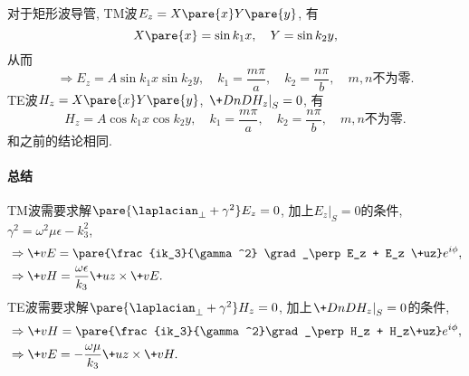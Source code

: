 \documentclass[hidelinks]{ctexart}
\begin{document}
\begin{sample}
    \begin{ex}
        对于矩形波导管, TM波$E_z = X\pare{x}Y\pare{y}$, 有
        \[ X\pare{x} = \sin k_1 x,\quad Y = \sin k_2 y, \]
        从而
        \[ \Rightarrow E_z = A\sin k_1 x \sin k_2 y,\quad k_1 = \frac{m\pi}{a},\quad k_2 = \frac{n\pi}{b},\quad m,n\text{不为零}. \]
        TE波$H_z = X\pare{x}Y\pare{y}$, $\displaystyle \left.\+DnD{H_z}\right\vert_S = 0$, 有
        \[ H_z = A \cos k_1 x \cos k_2 y, \quad k_1 = \frac{m\pi}{a},\quad k_2 = \frac{n\pi}{b},\quad m,n\text{不为零}. \]
        和之前的结论相同.
    \end{ex}
\end{sample}

\begin{resume}
\paragraph{总结} %
\label{par:总结}

TM波需要求解$\pare{\laplacian_\perp + \gamma^2}E_z = 0$, 加上$E_z\vert_S = 0$的条件, $\gamma^2 = \omega^2\mu\epsilon - k_3^2$,
\begin{align*}
    & \Rightarrow \+vE = \pare{\frac{ik_3}{\gamma^2} \grad_\perp E_z + E_z \+uz} e^{i\phi}, \\
    & \Rightarrow \+vH = \frac{\omega\epsilon}{k_3} \+uz\times \+vE.
\end{align*}
TE波需要求解$\pare{\laplacian_\perp + \gamma^2}H_z = 0$, 加上$\displaystyle \left.\+DnD{H_z}\right\vert_S = 0$的条件,
\begin{align*}
    & \Rightarrow \+vH = \pare{\frac{ik_3}{\gamma^2}\grad_\perp H_z + H_z\+uz}e^{i\phi}, \\
    & \Rightarrow \+vE = -\frac{\omega\mu}{k_3}\+uz\times \+vH.
\end{align*}
\end{resume}




\end{document}
